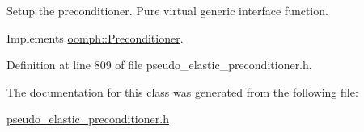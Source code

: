 Setup the preconditioner. Pure virtual generic interface function. 



Implements \hyperlink{classoomph_1_1Preconditioner_af4886f4efe510e5c9b0eb19422943588}{oomph\+::\+Preconditioner}.



Definition at line 809 of file pseudo\+\_\+elastic\+\_\+preconditioner.\+h.



The documentation for this class was generated from the following file\+:\begin{DoxyCompactItemize}
\item 
\hyperlink{pseudo__elastic__preconditioner_8h}{pseudo\+\_\+elastic\+\_\+preconditioner.\+h}\end{DoxyCompactItemize}
